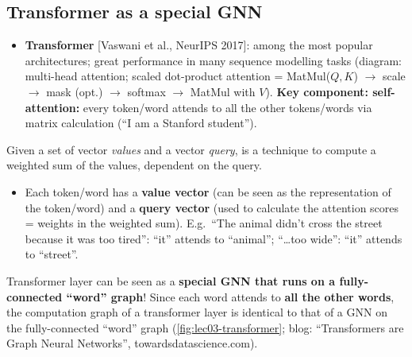 \subsection{Transformer as a special GNN}\label{sec:lec03-transformer}

\begin{itemize}
  \item \textbf{Transformer} [Vaswani et al., NeurIPS 2017]: among the most
    popular architectures; great performance in many sequence modelling tasks
    (diagram: multi-head attention; scaled dot-product attention = MatMul($Q,K$)
    $\to$ scale $\to$ mask (opt.) $\to$ softmax $\to$ MatMul with $V$).
    \textbf{Key component: self-attention:} every token/word attends to all
    the other tokens/words via matrix calculation (``I am a Stanford
    student'').
\end{itemize}
\begin{definition}[Attention]\label{def:lec03-attention}
  Given a set of vector \emph{values} and a vector \emph{query},
   is a technique to compute a weighted sum of the values,
  dependent on the query.
\end{definition}
\begin{itemize}
  \item Each token/word has a \textbf{value vector} (can be seen as the
    representation of the token/word) and a \textbf{query vector} (used to
    calculate the attention scores = weights in the weighted sum). E.g.\
    ``The animal didn't cross the street because it was too tired'': ``it''
    attends to ``animal''; ``\dots too wide'': ``it'' attends to ``street''.
\end{itemize}
\begin{keyidea}
  Transformer layer can be seen as a \textbf{special GNN that runs on a
  fully-connected ``word'' graph}! Since each word attends to \textbf{all the
  other words}, the computation graph of a transformer layer is identical to
  that of a GNN on the fully-connected ``word'' graph
  (\cref{fig:lec03-transformer}; blog: ``Transformers are Graph Neural
  Networks'', towardsdatascience.com).
\end{keyidea}


